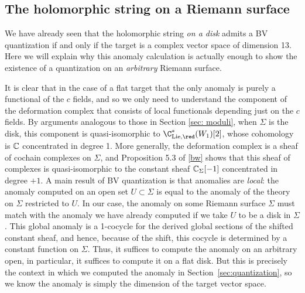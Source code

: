 
\subsection{The holomorphic string on a Riemann surface}

We have already seen that the holomorphic string {\it on a disk} admits a BV quantization if and only if the target is a complex vector space of dimension 13.
Here we will explain why this anomaly calculation is actually enough to show the existence of a quantization on an {\it arbitrary} Riemann surface. 

It is clear that  in the case of a flat target that the only anomaly is purely a functional of the $c$ fields,
and so we only need to understand the component of the deformation complex that consists of local functionals depending just on the $c$ fields.
By arguments analogous to those in Section \ref{sec: moduli}, 
when $\Sigma$ is the disk,
this component is quasi-isomorphic to $\C^*_{\Lie,\red}(W_1)[2]$,
whose cohomology is $\mathbb C$ concentrated in degree 1.
More generally, the deformation complex is a sheaf of cochain complexes on $\Sigma$, 
and Proposition 5.3 of \ref{bw} shows that this sheaf of complexes is quasi-isomorphic to the constant sheaf $\mathbb C_\Sigma[-1]$ concentrated in degree $+1$. 
A main result of BV quantization \cite{CosBook}  is that anomalies are {\em local}: the anomaly computed on an open set $U \subset \Sigma$ is equal to the anomaly of the theory on $\Sigma$ restricted to $U$. 
In our case, the anomaly on some Riemann surface $\Sigma$ must match with the anomaly we have already computed if we take $U$ to be a disk in $\Sigma$.
This global anomaly is a 1-cocycle for the derived global sections of the shifted constant sheaf, 
and hence, because of the shift, this cocycle is determined by a constant function on $\Sigma$.
Thus, it suffices to compute the anomaly on an arbitrary open, 
in particular, it suffices to compute it on a flat disk. 
But this is precisely the context in which we computed the anomaly in Section~\ref{sec:quantization}, 
so we know the anomaly is simply the dimension of the target vector space.

